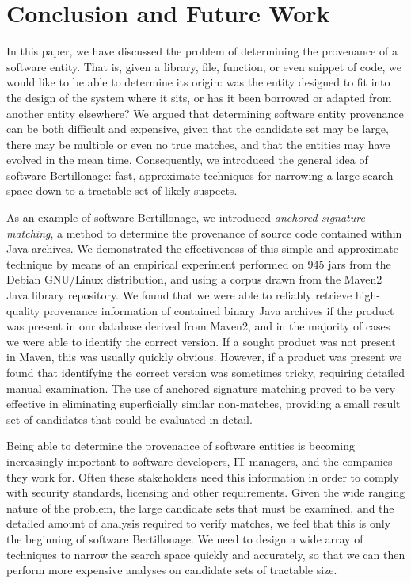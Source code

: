\section{Conclusion and Future Work{\label{sec:conclusion}}}

In this paper, we have discussed the problem of determining the provenance
of a software entity.  That is, given a library, file, function, or even
snippet of code, we would like to be able to determine its origin:  was the
entity designed to fit into the design of the system where it sits, or has
it been borrowed or adapted from another entity elsewhere?  We argued that
determining software entity provenance can be both difficult and expensive,
given that the candidate set may be large, there may be multiple or even no
true matches, and that the entities may have evolved in the mean time.
Consequently, we introduced the general idea of software Bertillonage:
fast, approximate techniques for narrowing a large search space down to a
tractable set of likely suspects.

As an example of software Bertillonage, we introduced \emph{anchored
signature matching}, a method to determine the provenance of source code
contained within Java archives.  We demonstrated the effectiveness of this
simple and approximate technique by means of an empirical experiment
performed on 945 jars from the Debian GNU/Linux distribution, and using a corpus drawn from
the Maven2 Java library repository.  We found that we were able to reliably
retrieve high-quality provenance information of contained binary Java archives
if the product was present in our database derived from Maven2, and in the majority of cases we were
able to identify the correct version.  If a sought product was not present
in Maven, this was usually quickly obvious.  However, if a product was
present we found that identifying the correct version was sometimes tricky,
requiring detailed manual examination.  The use of anchored signature
matching proved to be very effective in eliminating superficially similar
non-matches, providing a small result set of candidates that could be
evaluated in detail.

Being able to determine the provenance of software entities is becoming
increasingly important to software developers, IT managers, and the
companies they work for. Often these stakeholders need this information  in
order to comply with security standards, licensing and other requirements.
Given the wide ranging nature of the problem, the large candidate sets that
must be examined, and the detailed amount of analysis required to verify
matches, we feel that this is only the beginning of software Bertillonage.
We need to design a wide array of techniques to narrow the search space
quickly and accurately, so that we can then perform more expensive analyses
on candidate sets of tractable size.


